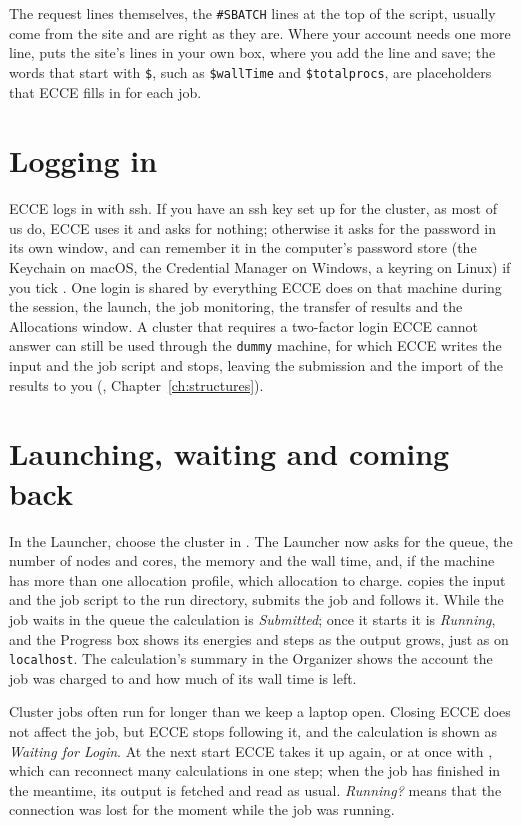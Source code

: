 The request lines themselves, the \texttt{\#SBATCH} lines at the top of the script, usually come from the site and are right as they are. Where your account needs one more line,  puts the site's lines in your own box, where you add the line and save; the words that start with \texttt{\$}, such as \texttt{\$wallTime} and \texttt{\$totalprocs}, are placeholders that ECCE fills in for each job.

\section{Logging in}
ECCE logs in with ssh. If you have an ssh key set up for the cluster, as most of us do, ECCE uses it and asks for nothing; otherwise it asks for the password in its own window, and can remember it in the computer's password store (the Keychain on macOS, the Credential Manager on Windows, a keyring on Linux) if you tick . One login is shared by everything ECCE does on that machine during the session, the launch, the job monitoring, the transfer of results and the Allocations window. A cluster that requires a two-factor login ECCE cannot answer can still be used through the \texttt{dummy} machine, for which ECCE writes the input and the job script and stops, leaving the submission and the import of the results to you (, Chapter~\ref{ch:structures}).

\section{Launching, waiting and coming back}
In the Launcher, choose the cluster in . The Launcher now asks for the queue, the number of nodes and cores, the memory and the wall time, and, if the machine has more than one allocation profile, which allocation to charge.  copies the input and the job script to the run directory, submits the job and follows it. While the job waits in the queue the calculation is \emph{Submitted}; once it starts it is \emph{Running}, and the Progress box shows its energies and steps as the output grows, just as on \texttt{localhost}. The calculation's summary in the Organizer shows the account the job was charged to and how much of its wall time is left.

Cluster jobs often run for longer than we keep a laptop open. Closing ECCE does not affect the job, but ECCE stops following it, and the calculation is shown as \emph{Waiting for Login}. At the next start ECCE takes it up again, or at once with , which can reconnect many calculations in one step; when the job has finished in the meantime, its output is fetched and read as usual. \emph{Running?} means that the connection was lost for the moment while the job was running.

